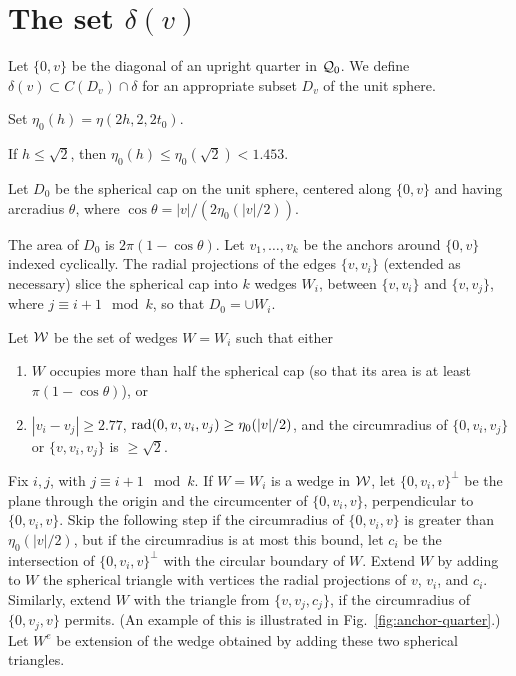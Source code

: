 \section{The set $\delta(v)$}
    \label{sec:deltaP}

Let $\{0,v\}$ be the diagonal of an upright quarter in ${\mathcal Q}_0$. We
define $\delta(v)\subset C(D_v)\cap \delta$ for an appropriate
subset $D_v$ of the unit sphere.

\begin{definition}\label{def:eta0}
Set $\eta_0(h)=\eta(2h,2,2t_0)$.
\end{definition}

If $h\le\sqrt2$, then $\eta_0(h)\le \eta_0(\sqrt2) <
1.453$.

Let $D_0$ be the spherical cap on the unit sphere, centered along
$\{0,v\}$ and having arcradius $\theta$, where
    $\cos\theta = |v|/(2\eta_0(|v|/2))$.


The area of $D_0$ is
    $2\pi(1-\cos\theta)$.
Let $v_1,\ldots,v_k$ be the anchors around $\{0,v\}$ indexed
cyclically. The radial projections of the edges $\{v,v_i\}$
(extended as necessary) slice the spherical cap into $k$ wedges
$W_i$, between
    $\{v,v_i\}$ and $\{v,v_j\}$,
where $j\equiv i+1\mod k$, so that
    $D_0 =\cup W_i$.

\begin{definition}\label{def:wedge}
Let ${\mathcal W}$ be the set of wedges $W=W_i$  such that either
\begin{enumerate}
    \item $W$ occupies more than half the spherical cap (so that
    its area is at least $\pi(1-\cos\theta)$), or
    \item
 $|v_i-v_j|\ge 2.77$,
    $\operatorname{rad}(0,v,v_i,v_j)\ge\eta_0(|v|/2)$, and the
    circumradius of $\{0,v_i,v_j\}$ or $\{v,v_i,v_j\}$ is
    $\ge\sqrt2$.
    \label{enum:wedge2}
\end{enumerate}
\end{definition}

Fix $i,j$, with $j\equiv i+1\mod k$. If $W = W_i$ is a wedge in
${\mathcal W}$, let $\{0,v_i,v\}^\perp$ be the plane through the origin and
the circumcenter of $\{0,v_i,v\}$, perpendicular to $\{0,v_i,v\}$.
Skip the following step if the circumradius of $\{0,v_i,v\}$ is
greater than $\eta_0(|v|/2)$, but if the circumradius is at most
this bound, let $c_i$ be the intersection of $\{0,v_i,v\}^\perp$
with the circular boundary of $W$.  Extend $W$ by adding to $W$
the spherical triangle with vertices the radial projections of
$v$, $v_i$, and $c_i$.  Similarly, extend $W$ with the triangle
from $\{v,v_j,c_j\}$, if the circumradius of $\{0,v_j,v\}$ permits.
(An example of this is illustrated in
Fig.~\ref{fig:anchor-quarter}.) Let $W^e$ be extension of the
wedge obtained by adding these two spherical triangles.


